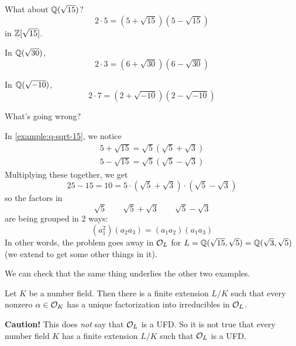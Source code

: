 \begin{example}\label{example:q-sqrt-15}
    What about $\mathbb Q(\sqrt{15})$?
    \[2\cdot 5 = (5 + \sqrt{15})(5 - \sqrt{15})\]
    in $\mathbb Z[\sqrt{15}]$.
\end{example}
\begin{example}
    In $\mathbb Q(\sqrt{30})$,
    \[2\cdot 3 = (6 + \sqrt{30})(6 - \sqrt{30})\]

    In $\mathbb Q(\sqrt{-10})$,
    \[2\cdot 7 = (2 + \sqrt{-10})(2 - \sqrt{-10})\]
\end{example}
\begin{ques*}
    What's going wrong?
\end{ques*}
In \cref{example:q-sqrt-15}, we notice
\begin{align*}
    5 + \sqrt{15} = \sqrt{5}(\sqrt{5} + \sqrt{3}) \\
    5 - \sqrt{15} = \sqrt{5}(\sqrt{5} - \sqrt{3})
\end{align*}
Multiplying these together, we get
\[25 - 15 = 10 = 5\cdot (\sqrt{5} + \sqrt{3})\cdot (\sqrt{5} - \sqrt{3})\]
so the factors in
\[\sqrt{5}\qquad \sqrt{5} + \sqrt{3} \qquad \sqrt{5} - \sqrt{3}\]
are being grouped in $2$ ways:
\[(a_1^2)(a_2a_3) = (a_1a_2)(a_1a_3)\]
In other words, the problem goes away in $\mathcal{O}_L$ for $L = \mathbb Q(\sqrt{15}, \sqrt{5}) = \mathbb Q(\sqrt{3}, \sqrt{5})$ (we extend to get some other things in it).

We can check that the same thing underlies the other two examples.

\begin{theorem}
    Let $K$ be a number field. Then there is a finite extension $L/K$ such that every nonzero $\alpha\in\mathcal{O}_K$ has a unique factorization into irreducibles in $\mathcal{O}_L$.
\end{theorem}

\textbf{Caution!} This does \emph{not} say that $\mathcal{O}_L$ is a UFD. So it is not true that every number field $K$ has a finite extension $L/K$ such that $\mathcal{O}_L$ is a UFD.